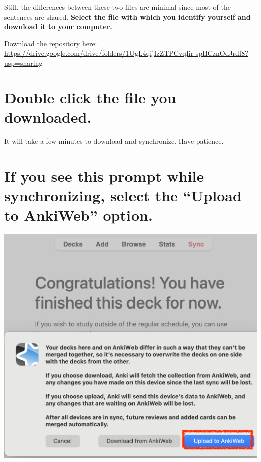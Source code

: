 \documentclass[
]{book}
\begin{document}
Still, the differences between these two files are minimal since most of the sentences are shared. \textbf{Select the file with which you identify yourself and download it to your computer.}

Download the repository here: \url{https://drive.google.com/drive/folders/1UgL4qijIzZTPCvqIir-spHCznOdJrdf8?usp=sharing}

\hypertarget{double-click-the-file-you-downloaded.}{%
\section{Double click the file you downloaded.}\label{double-click-the-file-you-downloaded.}}

It will take a few minutes to download and synchronize. Have patience.

\hypertarget{if-you-see-this-prompt-while-synchronizing-select-the-upload-to-ankiweb-option.}{%
\section*{If you see this prompt while synchronizing, select the ``Upload to AnkiWeb'' option.}\label{if-you-see-this-prompt-while-synchronizing-select-the-upload-to-ankiweb-option.}}

\includegraphics[width=1\linewidth]{images/reposit_en/subir_a_anki}
\end{document}
